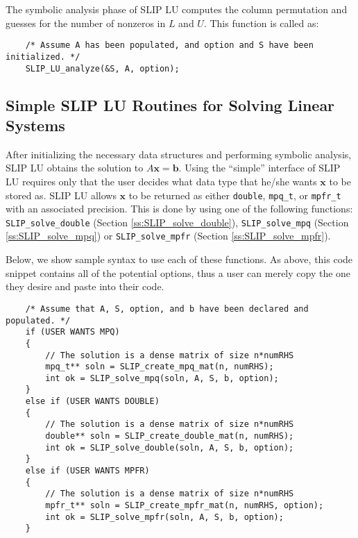 \documentclass[12pt]{article}
\theoremstyle{definition}
\begin{document}
The symbolic analysis phase of SLIP LU computes the column permutation and
guesses for the number of nonzeros in $L$ and $U$. This function is called as:

{\small
    \begin{verbatim}
    /* Assume A has been populated, and option and S have been initialized. */
    SLIP_LU_analyze(&S, A, option); \end{verbatim} }

\cprotect\subsection{Simple SLIP LU Routines for Solving Linear Systems}
\label{s:Using:simple}

After initializing the necessary data structures and performing symbolic
analysis, SLIP LU obtains the solution to $A \mathbf{x} = \mathbf{b}$. Using
the ``simple'' interface of SLIP LU requires only that the user decides what data
type that he/she wants $\mathbf{x}$ to be stored as. SLIP LU allows
$\mathbf{x}$ to be returned as either \verb|double|, \verb|mpq_t|, or
\verb|mpfr_t| with an associated precision. This is done by using one of the
following functions: \verb|SLIP_solve_double| (Section
\ref{ss:SLIP_solve_double}), \verb|SLIP_solve_mpq| (Section
\ref{ss:SLIP_solve_mpq}) or \verb|SLIP_solve_mpfr| (Section
\ref{ss:SLIP_solve_mpfr}).

Below, we show sample syntax to use each of these functions. As above, this
code snippet contains all of the potential options, thus a user can merely copy
the one they desire and paste into their code.

{\small
\begin{verbatim}
    /* Assume that A, S, option, and b have been declared and populated. */
    if (USER WANTS MPQ)
    {
        // The solution is a dense matrix of size n*numRHS
        mpq_t** soln = SLIP_create_mpq_mat(n, numRHS);
        int ok = SLIP_solve_mpq(soln, A, S, b, option);
    }
    else if (USER WANTS DOUBLE)
    {
        // The solution is a dense matrix of size n*numRHS
        double** soln = SLIP_create_double_mat(n, numRHS);
        int ok = SLIP_solve_double(soln, A, S, b, option);
    }
    else if (USER WANTS MPFR)
    {
        // The solution is a dense matrix of size n*numRHS
        mpfr_t** soln = SLIP_create_mpfr_mat(n, numRHS, option);
        int ok = SLIP_solve_mpfr(soln, A, S, b, option);
    } \end{verbatim}}
\end{document}

